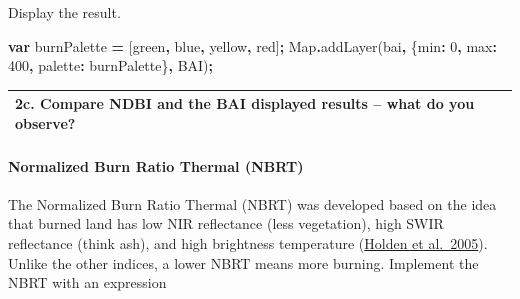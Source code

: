 \documentclass[
]{article}
\newenvironment{Shaded}{\begin{snugshade}}{\end{snugshade}}
\newcommand{\BuiltInTok}[1]{#1}
\newcommand{\DataTypeTok}[1]{\textcolor[rgb]{0.13,0.29,0.53}{#1}}
\newcommand{\DecValTok}[1]{\textcolor[rgb]{0.00,0.00,0.81}{#1}}
\newcommand{\FunctionTok}[1]{\textcolor[rgb]{0.00,0.00,0.00}{#1}}
\newcommand{\KeywordTok}[1]{\textcolor[rgb]{0.13,0.29,0.53}{\textbf{#1}}}
\newcommand{\NormalTok}[1]{#1}
\newcommand{\OperatorTok}[1]{\textcolor[rgb]{0.81,0.36,0.00}{\textbf{#1}}}
\newcommand{\StringTok}[1]{\textcolor[rgb]{0.31,0.60,0.02}{#1}}
\begin{document}
Display the result.

\begin{Shaded}
\begin{Highlighting}[]
\KeywordTok{var}\NormalTok{ burnPalette }\OperatorTok{=}\NormalTok{ [}\StringTok{\textquotesingle{}green\textquotesingle{}}\OperatorTok{,} \StringTok{\textquotesingle{}blue\textquotesingle{}}\OperatorTok{,} \StringTok{\textquotesingle{}yellow\textquotesingle{}}\OperatorTok{,} \StringTok{\textquotesingle{}red\textquotesingle{}}\NormalTok{]}\OperatorTok{;}   
\BuiltInTok{Map}\OperatorTok{.}\FunctionTok{addLayer}\NormalTok{(bai}\OperatorTok{,}\NormalTok{ \{}\DataTypeTok{min}\OperatorTok{:} \DecValTok{0}\OperatorTok{,} \DataTypeTok{max}\OperatorTok{:} \DecValTok{400}\OperatorTok{,}  \DataTypeTok{palette}\OperatorTok{:}\NormalTok{ burnPalette\}}\OperatorTok{,} \StringTok{\textquotesingle{}BAI\textquotesingle{}}\NormalTok{)}\OperatorTok{;}
\end{Highlighting}
\end{Shaded}

\begin{longtable}[]{@{}
  >{\raggedright\arraybackslash}p{}@{}}
\toprule
\endhead
\textbf{2c. Compare NDBI and the BAI displayed results -- what do you observe?} \\
\bottomrule
\end{longtable}

\hypertarget{normalized-burn-ratio-thermal-nbrt}{%
\paragraph{Normalized Burn Ratio Thermal (NBRT)}\label{normalized-burn-ratio-thermal-nbrt}}

The Normalized Burn Ratio Thermal (NBRT) was developed based on the idea that burned land has low NIR reflectance (less vegetation), high SWIR reflectance (think ash), and high brightness temperature (\href{http://www.tandfonline.com/doi/abs/10.1080/01431160500239008}{Holden et al.~2005}). Unlike the other indices, a lower NBRT means more burning. Implement the NBRT with an expression
\end{document}
